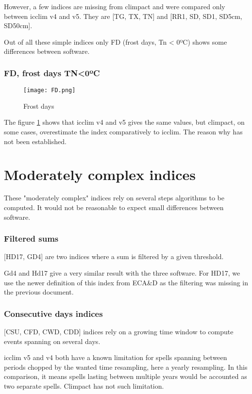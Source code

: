 \documentclass[a4paper,11pt]{article}
\begin{document}
    However, a few indices are missing from climpact and were compared only between icclim v4 and v5. 
    They are [TG, TX, TN] and [RR1, SD, SD1, SD5cm, SD50cm].

    Out of all these simple indices only FD (frost days, Tn < 0ºC) shows some differences between software.

    \section{FD, frost days TN<0ºC}
        \begin{figure}[!hbt]
            \centering
            \texttt{[image: FD.png]}
            \caption{Frost days}
            \label{figure/fd}
        \end{figure}
        The figure \ref{figure/fd} shows that icclim v4 and v5 gives the same values, but climpact, on some cases, overestimate the index comparatively to icclim.
        The reason why has not been established.
        

\part{Moderately complex indices}
    These "moderately complex" indices rely on several steps algorithms to be computed.
    It would not be reasonable to expect small differences between software.

    \section{Filtered sums}
        [HD17, GD4] are two indices where a sum is filtered by a given threshold.

        Gd4 and Hd17 give a very similar result with the three software.
        For HD17, we use the newer definition of this index from ECA\&D \cite{doc/ecad_new} as the filtering was missing in the previous document.

    \section{Consecutive days indices} \label{section/consecutive_days}
        [CSU, CFD, CWD, CDD] indices rely on a growing time window to compute events spanning on several days.

        icclim v5 and v4 both have a known limitation for spells spanning between periods chopped by the wanted time resampling, here a yearly resampling.
        In this comparison, it means spells lasting between multiple years would be accounted as two separate spells.
        Climpact has not such limitation.
\end{document}
